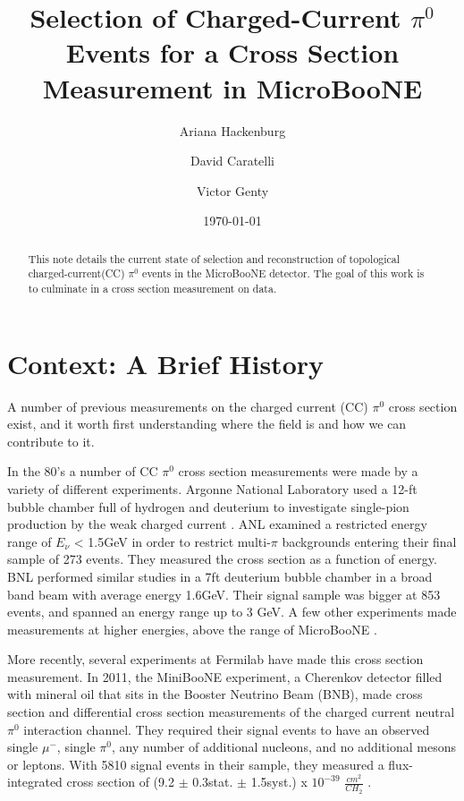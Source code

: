 \documentclass[a4paper]{article}
\title{\vspace{0.2in} Selection of Charged-Current $\pi^0$ Events for a Cross Section Measurement in MicroBooNE}
\author[2]{Ariana Hackenburg}
\author[1]{David Caratelli}
\author[1]{Victor Genty}
\affil[1]{Nevis Laboratories, Columbia University, New York, NY}
\affil[2]{Yale Univerity, New Haven, CT}
\date{\today}
\begin{document}
\maketitle

\begin{abstract}
This note details the current state of selection and reconstruction of topological charged-current(CC) $\pi^0$ events in the MicroBooNE detector. The goal of this work is to culminate in a cross section measurement on data.
\end{abstract}

\newpage

\tableofcontents

\newpage


\section{Context: A Brief History}
A number of previous measurements on the charged current (CC) $\pi^0$ cross section exist, and it worth first understanding where the field is and how we can contribute to it.  
\par In the 80's a number of CC $\pi^0$ cross section measurements were made by a variety of different experiments.  Argonne National Laboratory used a 12-ft bubble chamber full of hydrogen and deuterium to investigate single-pion production by the weak charged current \cite{bib:ANL1} \cite{bib:ANL2}. ANL examined a restricted energy range of $E_\nu$ < 1.5GeV in order to restrict multi-$\pi$ backgrounds entering their final sample of 273 events. They measured the cross section as a function of energy. BNL performed similar studies in a 7ft deuterium bubble chamber in a broad band beam with average energy 1.6GeV. Their signal sample was bigger at 853 events, and spanned an energy range up to 3 GeV. A few other experiments made measurements at higher energies, above the range of MicroBooNE \cite{bib:HE_unknown1} \cite{bib:HE_unknown2}.
\par More recently, several experiments at Fermilab have made this cross section measurement. In 2011, the MiniBooNE experiment, a Cherenkov detector filled with mineral oil that sits in the Booster Neutrino Beam (BNB), made cross section and differential cross section measurements of the charged current neutral $\pi^0$ interaction channel. They required their signal events to have an observed single $\mu^-$, single $\pi^0$, any number of additional nucleons, and no additional mesons or leptons. With 5810 signal events in their sample, they measured a flux-integrated cross section of (9.2 $\pm$ 0.3stat. $\pm$ 1.5syst.) x $10^{-39}$ $\frac{cm^2}{CH_2}$ \cite{bib:numucc_miniboone} \cite{bib:miniboone_thesis}.  
\end{document}
